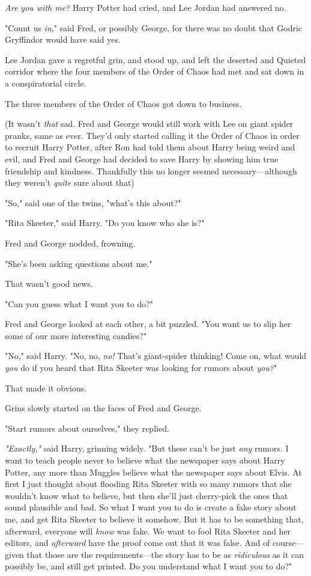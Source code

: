 \emph{Are you with me?} Harry Potter had cried, and Lee Jordan had answered no.

"Count us \emph{in}," said Fred, or possibly George, for there was no doubt
that Godric Gryffindor would have said yes.

Lee Jordan gave a regretful grin, and stood up, and left the deserted and
Quieted corridor where the four members of the Order of Chaos had met and sat
down in a conspiratorial circle.

The three members of the Order of Chaos got down to business.

(It wasn't \emph{that} sad. Fred and George would still work with Lee on giant
spider pranks, same as ever. They'd only started calling it the Order of Chaos
in order to recruit Harry Potter, after Ron had told them about Harry being
weird and evil, and Fred and George had decided to save Harry by showing him
true friendship and kindness. Thankfully this no longer seemed
necessary---although they weren't \emph{quite} sure about that{\el})

"So," said one of the twins, "what's this about?"

"Rita Skeeter," said Harry. "Do you know who she is?"

Fred and George nodded, frowning.

"She's been asking questions about me."

That wasn't good news.

"Can you guess what I want you to do?"

Fred and George looked at each other, a bit puzzled. "You want us to slip her
some of our more interesting candies?"

"No," said Harry. "No, no, \emph{no!} That's giant-spider thinking! Come on,
what would \emph{you} do if you heard that Rita Skeeter was looking for rumors
about \emph{you?}"

That made it obvious.

Grins slowly started on the faces of Fred and George.

"Start rumors about ourselves," they replied.

\emph{"Exactly,"} said Harry, grinning widely. "But these can't be just
\emph{any} rumors. I want to teach people never to believe what the newspaper
says about Harry Potter, any more than Muggles believe what the newspaper says
about Elvis. At first I just thought about flooding Rita Skeeter with so many
rumors that she wouldn't know what to believe, but then she'll just cherry-pick
the ones that sound plausible and bad. So what I want you to do is create a
fake story about me, and get Rita Skeeter to believe it somehow. But it has to
be something that, afterward, everyone will \emph{know} was fake. We want to
fool Rita Skeeter and her editors, and \emph{afterward} have the proof come out
that it was false. And of course---given that those are the requirements---the
story has to be as \emph{ridiculous} as it can possibly be, and still get
printed. Do you understand what I want you to do?"

